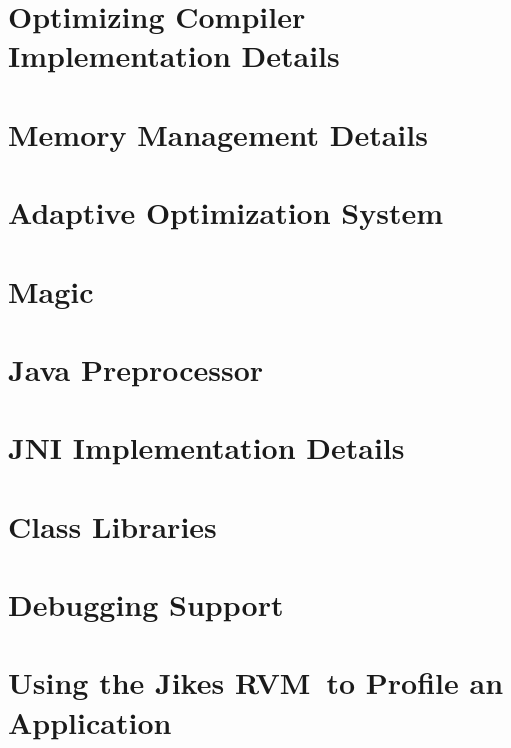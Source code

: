 \documentclass{article}
\newcommand{\jrvm}{Jikes RVM}
\begin{document}
\T \newpage
{}
\section{Optimizing Compiler Implementation Details}
\label{section:optdetails}


\T \newpage
{}
\section{Memory Management Details}
\label{section:JMTk}


\T \newpage
{}
\section{Adaptive Optimization System}
\label{section:aosdetails}


\T \newpage
{}
\section{Magic}


\T \newpage
{}
\section{Java Preprocessor}
\label{section:preprocessor}


\T \newpage
{}
\section{JNI Implementation Details}
\label{section:jni}


\T \newpage
{}
\section{Class Libraries}
\label{section:libraries}


\T \newpage
{}
\section{Debugging Support}
\label{section:debugging}


\T \newpage
{}
\section{Using the \jrvm\ to Profile an Application}

\end{document}
